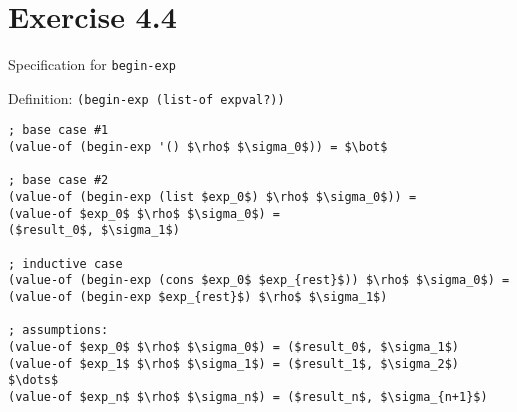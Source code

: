 \section*{Exercise 4.4}

Specification for \texttt{begin-exp}

Definition: \texttt{(begin-exp (list-of expval?))}


\begin{center}
\begin{lstlisting}[mathescape]
; base case #1
(value-of (begin-exp '() $\rho$ $\sigma_0$)) = $\bot$

; base case #2
(value-of (begin-exp (list $exp_0$) $\rho$ $\sigma_0$)) = 
(value-of $exp_0$ $\rho$ $\sigma_0$) =
($result_0$, $\sigma_1$)

; inductive case
(value-of (begin-exp (cons $exp_0$ $exp_{rest}$)) $\rho$ $\sigma_0$) =
(value-of (begin-exp $exp_{rest}$) $\rho$ $\sigma_1$)

; assumptions:
(value-of $exp_0$ $\rho$ $\sigma_0$) = ($result_0$, $\sigma_1$)
(value-of $exp_1$ $\rho$ $\sigma_1$) = ($result_1$, $\sigma_2$)
$\dots$
(value-of $exp_n$ $\rho$ $\sigma_n$) = ($result_n$, $\sigma_{n+1}$)


\end{lstlisting}
\end{center}
